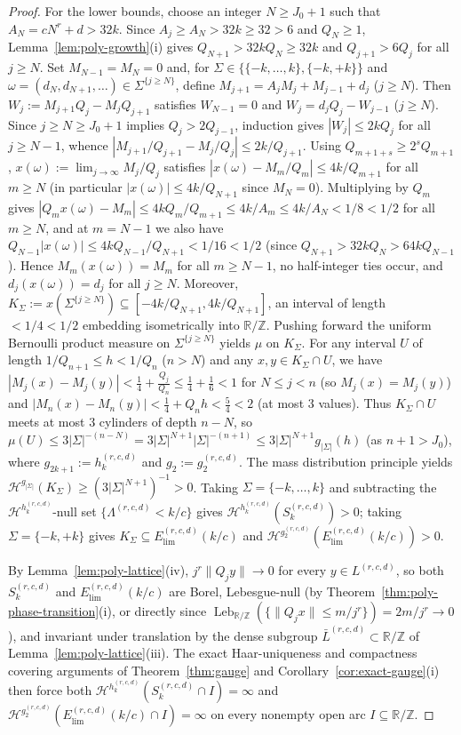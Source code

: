 \documentclass[11pt]{article}
\theoremstyle{definition}
\theoremstyle{remark}
\newcommand{\R}{\mathbb{R}}
\newcommand{\Z}{\mathbb{Z}}
\newcommand{\Lam}{\Lambda}
\begin{document}
\begin{proof}
For the lower bounds, choose an integer $N\ge J_0+1$ such that
$A_N=cN^r+d>32k$. Since $A_j\ge A_N>32k\ge32>6$ and $Q_N\ge1$, Lemma~\ref{lem:poly-growth}(i)
gives $Q_{N+1}>32kQ_N\ge32k$ and $Q_{j+1}>6Q_j$ for all $j\ge N$. Set
$M_{N-1}=M_N=0$ and, for $\Sigma\in\{\{-k,\dots,k\},\{-k,+k\}\}$ and
$\omega=(d_N,d_{N+1},\dots)\in\Sigma^{\{j\ge N\}}$, define $M_{j+1}=A_jM_j+M_{j-1}+d_j$
($j\ge N$). Then $W_j:=M_{j+1}Q_j-M_jQ_{j+1}$ satisfies $W_{N-1}=0$ and
$W_j=d_jQ_j-W_{j-1}$ ($j\ge N$). Since $j\ge N\ge J_0+1$ implies $Q_j>2Q_{j-1}$,
induction gives $|W_j|\le2kQ_j$ for all $j\ge N-1$, whence
$|M_{j+1}/Q_{j+1}-M_j/Q_j|\le2k/Q_{j+1}$. Using $Q_{m+1+s}\ge2^sQ_{m+1}$,
$x(\omega):=\lim_{j\to\infty}M_j/Q_j$ satisfies $|x(\omega)-M_m/Q_m|\le4k/Q_{m+1}$
for all $m\ge N$ (in particular $|x(\omega)|\le4k/Q_{N+1}$ since $M_N=0$).
Multiplying by $Q_m$ gives $|Q_mx(\omega)-M_m|\le4kQ_m/Q_{m+1}\le4k/A_m\le4k/A_N<1/8<1/2$
for all $m\ge N$, and at $m=N-1$ we also have $Q_{N-1}|x(\omega)|\le4kQ_{N-1}/Q_{N+1}<1/16<1/2$
(since $Q_{N+1}>32kQ_N>64kQ_{N-1}$). Hence $M_m(x(\omega))=M_m$ for all $m\ge N-1$,
no half-integer ties occur, and $d_j(x(\omega))=d_j$ for all $j\ge N$. Moreover,
$K_\Sigma:=x(\Sigma^{\{j\ge N\}})\subseteq[-4k/Q_{N+1},4k/Q_{N+1}]$, an interval
of length $<1/4<1/2$ embedding isometrically into $\R/\Z$. Pushing forward the
uniform Bernoulli product measure on $\Sigma^{\{j\ge N\}}$ yields $\mu$ on $K_\Sigma$.
For any interval $U$ of length $1/Q_{n+1}\le h<1/Q_n$ ($n>N$) and any $x,y\in K_\Sigma\cap U$,
we have $|M_j(x)-M_j(y)|<\frac14+\frac{Q_j}{Q_n}\le\frac14+\frac16<1$ for $N\le j<n$
(so $M_j(x)=M_j(y)$) and $|M_n(x)-M_n(y)|<\frac14+Q_nh<\frac54<2$ (at most $3$ values).
Thus $K_\Sigma\cap U$ meets at most $3$ cylinders of depth $n-N$, so
$\mu(U)\le3|\Sigma|^{-(n-N)}=3|\Sigma|^{N+1}|\Sigma|^{-(n+1)}\le3|\Sigma|^{N+1}g_{|\Sigma|}(h)$
(as $n+1>J_0$), where $g_{2k+1}:=h_k^{(r,c,d)}$ and $g_2:=g_2^{(r,c,d)}$. The
mass distribution principle yields $\mathcal H^{g_{|\Sigma|}}(K_\Sigma)\ge(3|\Sigma|^{N+1})^{-1}>0$.
Taking $\Sigma=\{-k,\dots,k\}$ and subtracting the $\mathcal H^{h_k^{(r,c,d)}}$-null
set $\{\Lam^{(r,c,d)}<k/c\}$ gives $\mathcal H^{h_k^{(r,c,d)}}(S_k^{(r,c,d)})>0$;
taking $\Sigma=\{-k,+k\}$ gives $K_\Sigma\subseteq E_{\mathrm{lim}}^{(r,c,d)}(k/c)$
and $\mathcal H^{g_2^{(r,c,d)}}(E_{\mathrm{lim}}^{(r,c,d)}(k/c))>0$.

By Lemma~\ref{lem:poly-lattice}(iv), $j^r\|Q_jy\|\to0$ for every $y\in L^{(r,c,d)}$,
so both $S_k^{(r,c,d)}$ and $E_{\mathrm{lim}}^{(r,c,d)}(k/c)$ are Borel,
Lebesgue-null (by Theorem~\ref{thm:poly-phase-transition}(i), or directly since
$\operatorname{Leb}_{\R/\Z}(\{\|Q_jx\|\le m/j^r\})=2m/j^r\to0$), and invariant
under translation by the dense subgroup $\bar L^{(r,c,d)}\subset\R/\Z$ of
Lemma~\ref{lem:poly-lattice}(iii). The exact Haar-uniqueness and compactness
covering arguments of Theorem~\ref{thm:gauge} and Corollary~\ref{cor:exact-gauge}(i)
then force both $\mathcal H^{h_k^{(r,c,d)}}(S_k^{(r,c,d)}\cap I)=\infty$ and
$\mathcal H^{g_2^{(r,c,d)}}(E_{\mathrm{lim}}^{(r,c,d)}(k/c)\cap I)=\infty$ on
every nonempty open arc $I\subseteq\R/\Z$.


\end{proof}
\end{document}
